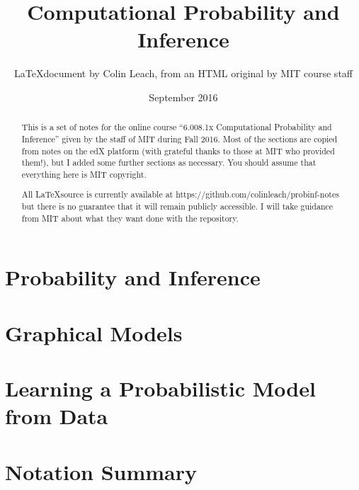 



\title{Computational Probability and Inference}
\author{\LaTeX document by Colin Leach, from an HTML original by MIT course staff\\}
\date{September 2016}
\maketitle

\begin{abstract}
This is a set of notes for the online course ``6.008.1x Computational Probability and Inference'' given by the staff of MIT during Fall 2016. Most of the sections are copied from notes on the edX platform (with grateful thanks to those at MIT who provided them!), but I added some further sections as necessary. You should assume that everything here is MIT copyright.

All \LaTeX source is currently available at https://github.com/colinleach/probinf-notes but there is no guarantee that it will remain publicly accessible. I will take guidance from MIT about what they want done with the repository.
\end{abstract}

\tableofcontents

\setlength{\parindent}{0pt}
\setlength{\parskip}{0.5em}
\setlength{\intextsep}{2mm}

\chapter{Probability and Inference}












\chapter{Graphical Models}


\chapter{Learning a Probabilistic Model from Data}

\appendix
\chapter{Notation Summary}



